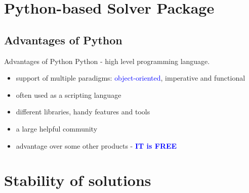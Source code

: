 \section{Python-based Solver Package}
\subsection{Advantages of Python}
\begin{frame}[t]{Advantages of Python}
Python - high level programming language.
	\begin{itemize}
	\item support of multiple paradigms: \textcolor{blue}{object-oriented}, imperative and functional 

	\item often used as a scripting language

	\item different libraries, handy features and tools 

	\item a large helpful community

	\item advantage over some other products - \textcolor{blue}{\textbf{IT is FREE}}
	\end{itemize}
\end{frame}

\section{Stability of solutions}

